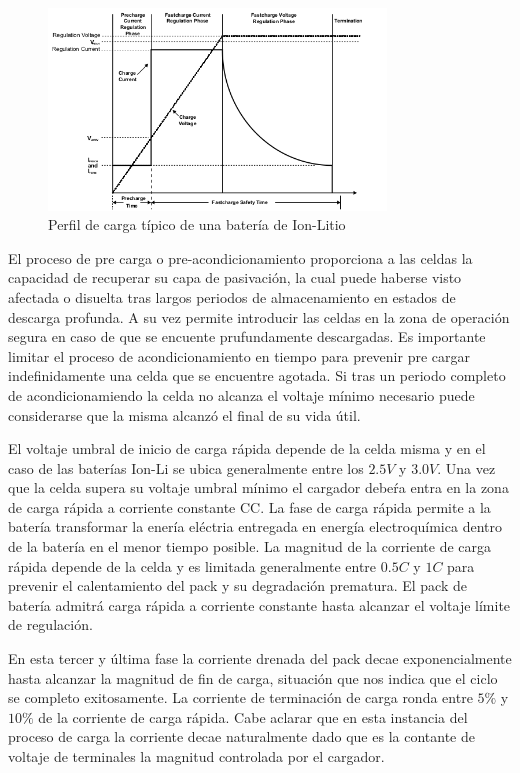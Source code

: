 \documentclass[10pt,a4paper]{article}
\begin{document}
    \begin{figure}[h!]
     \centering
     \includegraphics[width=0.8\textwidth]{bat_char/char_profile.png}
     \caption{Perfil de carga típico de una batería de Ion-Litio}
     \label{fig:char_prof}
    \end{figure}
   \FloatBarrier

   El proceso de pre carga o pre-acondicionamiento proporciona a las celdas la
capacidad de recuperar su capa de pasivación, la cual puede haberse visto
afectada o disuelta tras largos periodos de almacenamiento en estados de
descarga profunda. A su vez permite introducir las celdas en la zona de
operación segura en caso de que se encuente prufundamente descargadas. 
Es importante limitar el proceso de acondicionamiento en tiempo para prevenir pre
cargar indefinidamente una celda que se encuentre agotada. Si tras un periodo
completo de acondicionamiendo la celda no alcanza el voltaje mínimo necesario puede
considerarse que la misma alcanzó el final de su vida útil.

El voltaje umbral de inicio de carga rápida depende de la celda misma y en el
caso de las baterías \acrshort{Ion-Li} se ubica generalmente entre los $2.5V$ y $3.0V$.
Una vez que la celda supera su voltaje umbral mínimo el cargador debeŕa entra en la zona de carga
rápida a corriente constante \acrshort{CC}. La fase de carga rápida permite a la
batería transformar la enería eléctria entregada en
energía electroquímica dentro de la batería en el menor tiempo posible. La magnitud de la corriente de
carga rápida depende de la celda y es limitada generalmente entre $0.5C$ y $1C$ para prevenir el calentamiento del
pack y su degradación prematura. El pack de batería admitrá carga rápida a corriente
constante hasta alcanzar el voltaje límite de regulación. 

En esta tercer y última fase la corriente drenada del pack decae exponencialmente hasta
alcanzar la magnitud de fin de carga, situación que nos indica que el ciclo 
se completo exitosamente. La corriente de terminación de carga ronda entre
$5\%$ y $10 \%$ de la corriente de carga rápida. Cabe aclarar que en esta
instancia del proceso de carga la corriente decae naturalmente dado que es la
contante de voltaje de terminales la magnitud controlada por el cargador.  
\end{document}
